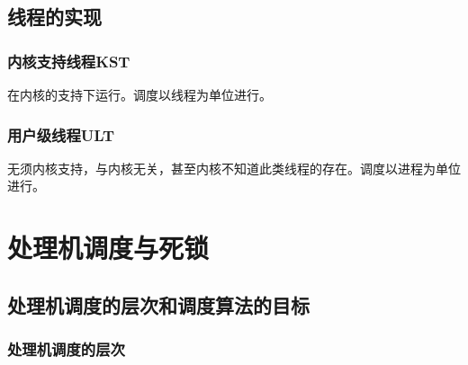 \documentclass[12pt, a4paper, oneside]{ctexart}
\begin{document}
\subsection{线程的实现}

\subsubsection{内核支持线程KST}

在内核的支持下运行。调度以线程为单位进行。

\subsubsection{用户级线程ULT}

无须内核支持，与内核无关，甚至内核不知道此类线程的存在。调度以进程为单位进行。

\newpage
\section{处理机调度与死锁}

\subsection{处理机调度的层次和调度算法的目标}

\subsubsection{处理机调度的层次}
\end{document}
